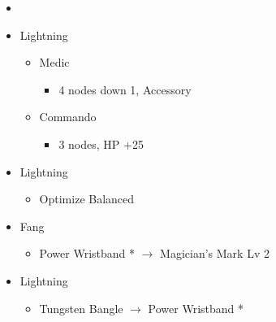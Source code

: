 \begin{multicols}{2}
\begin{menu}
\begin{itemize}
    \paradigm
    \begin{itemize}
        \item {}%
{\paradigmline{\com}{\com}{\rav}}
{\paradigmline{\com}{\rav}{\rav}}%
{\paradigmline{\sab}{\rav}{\rav}}%
{\paradigmline{\sen}{\rav}{\rav}}%
{\paradigmline[5]{\textit{(\com)}}{\textit{(\com)}}{\textit{\syn}}}%
{\paradigmline{(\com)}{(\com)}{(\med)}}
    \end{itemize}
    \crystarium
    \begin{itemize}
        \item Lightning
        \begin{itemize}
            \item Medic
            \begin{itemize}
                \item 4 nodes down 1, Accessory
            \end{itemize}
            \item Commando
            \begin{itemize}
                \item 3 nodes, HP +25
            \end{itemize}
        \end{itemize}
    \end{itemize}
    \equip
    \begin{itemize}
        \item Lightning
        \begin{itemize}
                \item Optimize Balanced
        \end{itemize}
        \item Fang
        \begin{itemize}
                \item Power Wristband * $\rightarrow$ Magician's Mark Lv 2
        \end{itemize}
        \item Lightning
        \begin{itemize}
                \item Tungsten Bangle $\rightarrow$ Power Wristband *
        \end{itemize}
    \end{itemize}
\end{itemize}
\end{menu}


\end{multicols}
